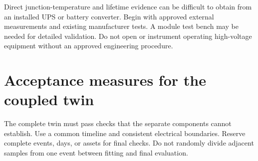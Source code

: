 \documentclass[11pt,a4paper]{report}
\begin{document}
Direct junction-temperature and lifetime evidence can be difficult to obtain from an installed UPS or battery converter.
Begin with approved external measurements and existing manufacturer tests.
A module test bench may be needed for detailed validation.
Do not open or instrument operating high-voltage equipment without an approved engineering procedure.

\section{Acceptance measures for the coupled twin}
The complete twin must pass checks that the separate components cannot establish.
Use a common timeline and consistent electrical boundaries.
Reserve complete events, days, or assets for final checks.
Do not randomly divide adjacent samples from one event between fitting and final evaluation.
\end{document}
